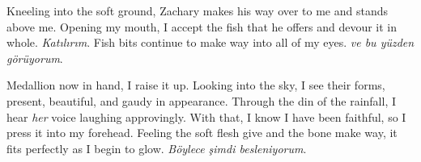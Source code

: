 Kneeling into the soft ground, Zachary makes his way over to me and stands above me. Opening my
mouth, I accept the fish that he offers and devour it in whole. \textit{Katılırım}. Fish bits
continue to make way into all of my eyes. \textit{ve bu yüzden görüyorum}.

Medallion now in hand, I raise it up. Looking into the sky, I see their forms, present, beautiful,
and gaudy in appearance. Through the din of the rainfall, I hear \textit{her} voice laughing
approvingly. With that, I know I have been faithful, so I press it into my forehead. Feeling the
soft flesh give and the bone make way, it fits perfectly as I begin to glow. \textit{Böylece şimdi
besleniyorum}.
